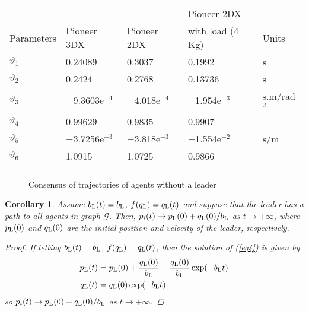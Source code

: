 \documentclass{cta-author}
\newtheorem{corollary}{Corollary}{}
\begin{document}
\begin{table}[!t]
{\begin{tabular}{@{\extracolsep{\fill}}lllll}\toprule
& & & Pioneer 2DX \\
Parameters & Pioneer 3DX & Pioneer 2DX & with load (4\,Kg) & Units\\\midrule
$\vartheta_{1}$ & \phantom{$-$}0.24089 & \phantom{$-$}0.3037 & \phantom{$-$}0.1992 & s \\
$\vartheta_{2}$ & \phantom{$-$}0.2424 & \phantom{$-$}0.2768 & \phantom{$-$}0.13736 & s \\
$\vartheta_{3}$ & $-$9.3603e$^{-4}$ & $-$4.018e$^{-4}$ & $-$1.954e$^{-3}$ & s.m/rad$^{2}$ \\
$\vartheta_{4}$ & \phantom{$-$}0.99629 & \phantom{$-$}0.9835 & \phantom{$-$}0.9907 \\
$\vartheta_{5}$ & $-$3.7256e$^{-3}$ & $-$3.818e$^{-3}$ & $-$1.554e$^{-2}$ & s/m \\
$\vartheta_{6}$ & \phantom{$-$}1.0915 & \phantom{$-$}1.0725 & \phantom{$-$}0.9866\\\botrule
\end{tabular}}{}
\end{table}

\begin{figure}[!t]
\caption{Consensus of trajectories of agents without a leader
\label{fig2}}
\vskip-5pt
\end{figure}

\begin{corollary}\label{cor2}
Assume $b_{\rm L}(t)=b_{\rm L}$, $f(q_{\rm L})=q_{\rm L}(t)$ and suppose that the leader has
a path to all agents in graph $\mathcal{G}$. Then, $p_{i}(t)\rightarrow
p_{\rm L}(0)+{q_{\rm L}(0)}/{b_{\rm L}}$ as $t\rightarrow
+\infty$, where $p_{\rm L}(0)$ and $q_{\rm L}(0)$ are the initial position
and velocity of the leader, respectively.

\begin{proof}
If letting $b_{\rm L}(t)=b_{\rm L}$, $f(q_{\rm L})=q_{\rm L}(t)$,
then the solution of (\ref{eq4}) is given by
\vspace*{-2pt}\begin{align*}
p_{\rm L}(t)&=p_{\rm L}(0)+\frac{q_{\rm L}(0)}{b_{\rm L}}-\frac{q_{\rm L}(0)}{b_{\rm L}}\exp(-b_{\rm L}t)\\
q_{\rm L}(t)&=q_{\rm L}(0)\exp(-b_{\rm L}t)
\vspace*{-2pt}\end{align*}
so $p_{i}(t)\rightarrow
p_{\rm L}(0)+{q_{\rm L}(0)}/{b_{\rm L}}$ as $t\rightarrow+\infty$.
\end{proof}
\end{corollary}
\end{document}

